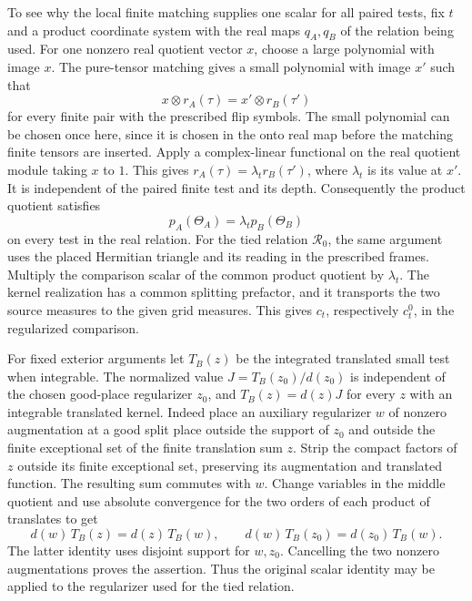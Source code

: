 To see why the local finite matching supplies one
scalar for all paired tests, fix \(t\) and a product
coordinate system with the real maps \(q_A,q_B\)
of the relation being used. For one nonzero real
quotient vector \(x\), choose a large polynomial
with image \(x\). The pure-tensor matching gives
a small polynomial with image \(x'\) such that
\[
 x\otimes r_A(\tau)=x'\otimes r_B(\tau')
\]
for every finite pair with the prescribed flip
symbols. The small polynomial can be chosen once
here, since it is chosen in the onto real map before
the matching finite tensors are inserted. Apply
a complex-linear functional on the real quotient module taking
\(x\) to \(1\). This gives
\(r_A(\tau)=\lambda_t r_B(\tau')\), where \(\lambda_t\)
is its value at \(x'\). It is independent of the
paired finite test and its depth. Consequently
the product quotient satisfies
\[
 p_A(\Theta_A)=\lambda_t p_B(\Theta_B)
\]
on every test in the real relation. For the tied
relation \(\mathscr R_0\), the same argument uses
the placed Hermitian triangle and its reading in
the prescribed frames. Multiply the comparison
scalar of the common product quotient by
\(\lambda_t\). The kernel realization has a common
splitting prefactor, and it transports the two
source measures to the given grid measures. This
gives \(c_t\), respectively \(c_t^0\), in the
regularized comparison.

For fixed exterior arguments let \(T_B(z)\) be the
integrated translated small test when integrable.
The normalized value \(J=T_B(z_0)/d(z_0)\) is
independent of the chosen good-place regularizer
\(z_0\), and \(T_B(z)=d(z)J\) for every \(z\) with an
integrable translated kernel. Indeed place an auxiliary
regularizer \(w\) of nonzero augmentation at a good
split place outside the support of \(z_0\) and outside
the finite exceptional set of the finite translation
sum \(z\). Strip the compact factors of \(z\) outside
its finite exceptional set, preserving its augmentation
and translated function. The resulting sum commutes
with \(w\). Change variables in the middle quotient
and use absolute convergence for the two orders of
each product of translates to get
\[
 d(w)\,T_B(z)=d(z)\,T_B(w),\qquad
 d(w)\,T_B(z_0)=d(z_0)\,T_B(w).
\]
The latter identity uses disjoint support for \(w,z_0\).
Cancelling the two nonzero augmentations proves the
assertion. Thus the original scalar identity may be
applied to the regularizer used for the tied relation.

